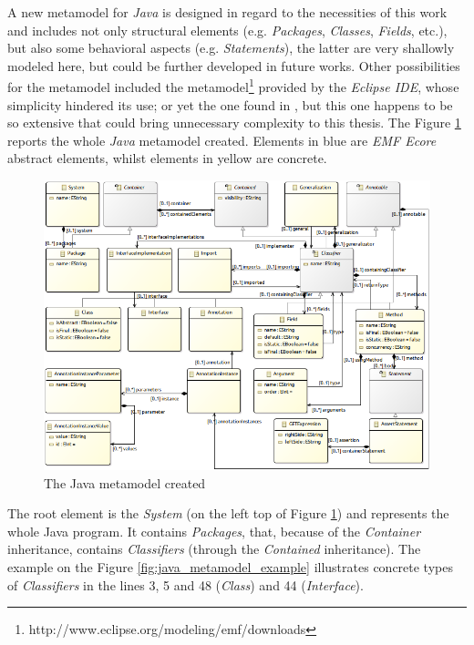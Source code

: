 \documentclass[tuberlin,cic,tc,english,noabntcite]{iiufrgs}
\begin{document}
A new metamodel for \emph{Java} is designed in regard to the necessities of this work and includes not only structural elements (e.g. \emph{Packages}, \emph{Classes}, \emph{Fields}, etc.), but also some behavioral aspects (e.g. \emph{Statements}), the latter are very shallowly modeled here, but could be further developed in future works. Other possibilities for the metamodel included the metamodel\footnote{http://www.eclipse.org/modeling/emf/downloads} provided by the \emph{Eclipse IDE}, whose simplicity hindered its use; or yet the one found in \citet{heidenreich2010closing}, but this one happens to be so extensive that could bring unnecessary complexity to this thesis. The Figure \ref{fig:java_metamodel} reports the whole \emph{Java} metamodel created. Elements in blue are \emph{EMF Ecore} abstract elements, whilst elements in yellow are concrete.

\begin{figure}[H]
    \caption{The Java metamodel created}
    \begin{center}
        \includegraphics[width=\textwidth]{javaMetamodel}
    \end{center}
    \label{fig:java_metamodel}
\end{figure}

The root element is the \emph{System} (on the left top of Figure \ref{fig:java_metamodel}) and represents the whole Java program. It contains \emph{Packages}, that, because of the \emph{Container} inheritance, contains \emph{Classifiers} (through the \emph{Contained} inheritance). The example on the Figure \ref{fig:java_metamodel_example} illustrates concrete types of \emph{Classifiers} in the lines 3, 5 and 48 (\emph{Class}) and 44 (\emph{Interface}).
\end{document}
